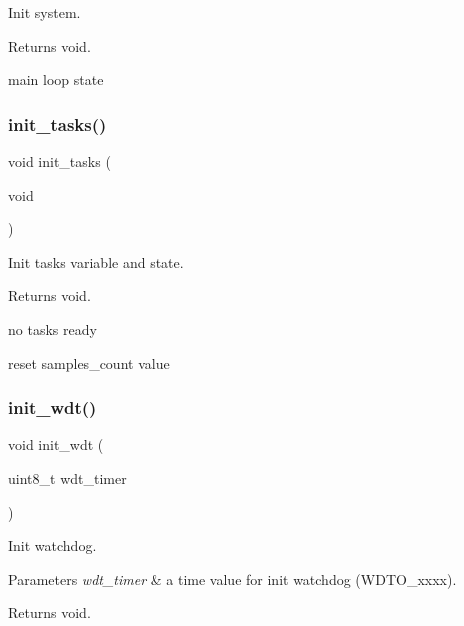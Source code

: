 Init system. 

\begin{DoxyReturn}{Returns}
void. 
\end{DoxyReturn}
main loop state \mbox{\label{i2c-rain_8h_a2aae2290a141fddcea3fb6009acbb445}} 
\subsubsection{\texorpdfstring{init\+\_\+tasks()}{init\_tasks()}}
{\footnotesize\ttfamily void init\+\_\+tasks (\begin{DoxyParamCaption}\item[{void}]{ }\end{DoxyParamCaption})}



Init tasks variable and state. 

\begin{DoxyReturn}{Returns}
void. 
\end{DoxyReturn}
no tasks ready

reset samples\+\_\+count value \mbox{\label{i2c-rain_8h_a980e73df66b14b1190bc25da430a4f12}} 
\subsubsection{\texorpdfstring{init\+\_\+wdt()}{init\_wdt()}}
{\footnotesize\ttfamily void init\+\_\+wdt (\begin{DoxyParamCaption}\item[{uint8\+\_\+t}]{wdt\+\_\+timer }\end{DoxyParamCaption})}



Init watchdog. 


\begin{DoxyParams}{Parameters}
{\em wdt\+\_\+timer} & a time value for init watchdog (W\+D\+T\+O\+\_\+xxxx). \\
\hline
\end{DoxyParams}
\begin{DoxyReturn}{Returns}
void. 
\end{DoxyReturn}
\mbox{\label{i2c-rain_8h_a7c21452937863fa02a29654247eef09b}} 
